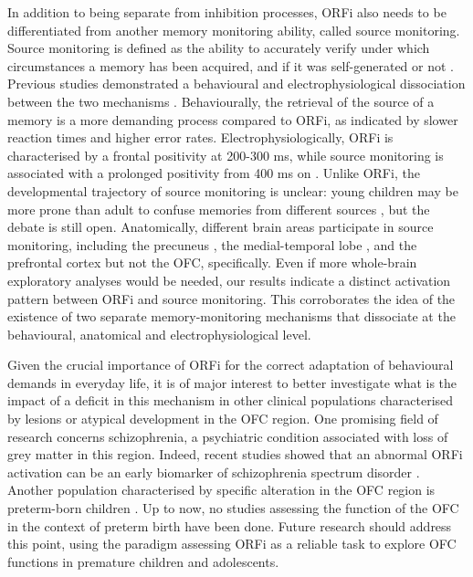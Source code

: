 In addition to being separate from inhibition processes, ORFi also needs to be differentiated from another memory monitoring ability, called source monitoring. Source monitoring is defined as the ability to accurately verify under which circumstances a memory has been acquired, and if it was self-generated or not \citep{Mitchell2009}. Previous studies demonstrated a behavioural and electrophysiological dissociation between the two mechanisms  \citep{Bouzerda-Wahlen2015}. Behaviourally, the retrieval of the source of a memory is a more demanding process compared to ORFi, as indicated by slower reaction times and higher error rates. Electrophysiologically, ORFi is characterised by a frontal positivity at 200-300 ms, while source monitoring is associated with a prolonged positivity from 400 ms on \citet{Bouzerda-Wahlen2015}. Unlike ORFi, the developmental trajectory of source monitoring is unclear: young children may be more prone than adult to confuse memories from different sources \citep{Lindsay1991}, but the debate is still open. Anatomically, different brain areas participate in source monitoring, including the precuneus \citep{Lundstrom2005}, the medial-temporal lobe \citep{Ross2008}, and the prefrontal cortex \citep{Mitchell2004, Mitchell2009} but not the OFC, specifically. Even if more whole-brain exploratory analyses would be needed, our results indicate a distinct activation pattern between ORFi and source monitoring. This corroborates the idea of the existence of two separate memory-monitoring mechanisms that dissociate at the behavioural, anatomical and electrophysiological level. 

Given the crucial importance of ORFi for the correct adaptation of behavioural demands in everyday life, it is of major interest to better investigate what is the impact of a deficit in this mechanism in other clinical populations characterised by lesions or atypical development in the OFC region. One promising field of research concerns schizophrenia, a psychiatric condition associated with loss of grey matter in this region. Indeed, recent studies showed that an abnormal ORFi activation can be an early biomarker of schizophrenia spectrum disorder \citep{Theze2019}. Another population characterised by specific alteration in the OFC region is preterm-born children \citep{Gimenez2006}. Up to now, no studies assessing the function of the OFC in the context of preterm birth have been done. Future research should address this point, using the paradigm assessing ORFi as a reliable task to explore OFC functions in premature children and adolescents. 

